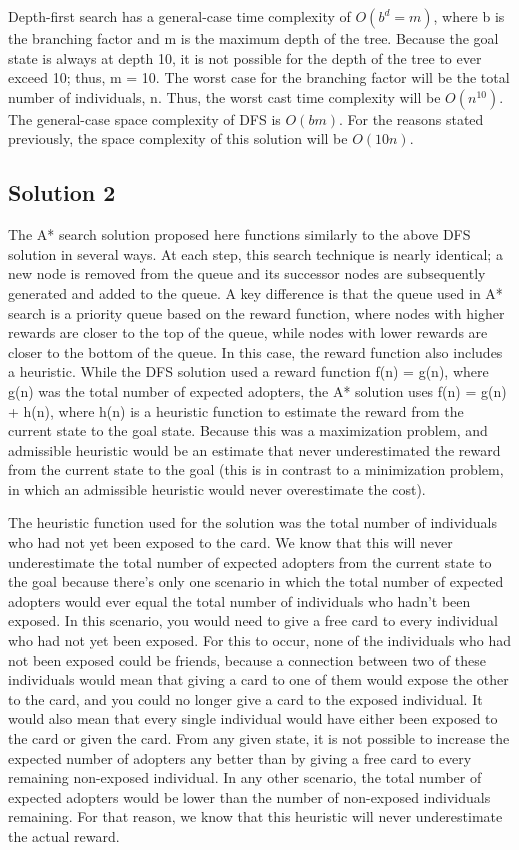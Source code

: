 \documentclass[11pt,journal]{IEEEtran}
\begin{document}
Depth-first search has a general-case time complexity of $O(b^d=m)$, where b is the branching factor and m is the maximum depth of the tree. Because the goal state is always at depth 10, it is not possible for the depth of the tree to ever exceed 10; thus, m = 10. The worst case for the branching factor will be the total number of individuals, n. Thus, the worst cast time complexity will be $O(n^{10})$. The general-case space complexity of DFS is $O(bm)$. For the reasons stated previously, the space complexity of this solution will be $O(10n)$.

\subsection{Solution 2}
The A* search solution proposed here functions similarly to the above DFS solution in several ways. At each step, this search technique is nearly identical; a new node is removed from the queue and its successor nodes are subsequently generated and added to the queue. A key difference is that the queue used in A* search is a priority queue based on the reward function, where nodes with higher rewards are closer to the top of the queue, while nodes with lower rewards are closer to the bottom of the queue. In this case, the reward function also includes a heuristic. While the DFS solution used a reward function f(n) = g(n), where g(n) was the total number of expected adopters, the A* solution uses f(n) = g(n) + h(n), where h(n) is a heuristic function to estimate the reward from the current state to the goal state. Because this was a maximization problem, and admissible heuristic would be an estimate that never underestimated the reward from the current state to the goal (this is in contrast to a minimization problem, in which an admissible heuristic would never overestimate the cost).

The heuristic function used for the solution was the total number of individuals who had not yet been exposed to the card. We know that this will never underestimate the total number of expected adopters from the current state to the goal because there's only one scenario in which the total number of expected adopters would ever equal the total number of individuals who hadn't been exposed. In this scenario, you would need to give a free card to every individual who had not yet been exposed. For this to occur, none of the individuals who had not been exposed could be friends, because a connection between two of these individuals would mean that giving a card to one of them would expose the other to the card, and you could no longer give a card to the exposed individual. It would also mean that every single individual would have either been exposed to the card or given the card. From any given state, it is not possible to increase the expected number of adopters any better than by giving a free card to every remaining non-exposed individual. In any other scenario, the total number of expected adopters would be lower than the number of non-exposed individuals remaining. For that reason, we know that this heuristic will never underestimate the actual reward.
\end{document}
